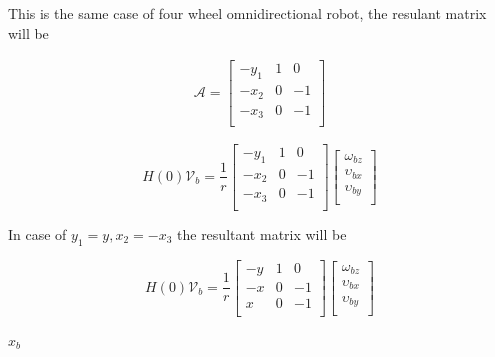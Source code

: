\documentclass{article}
\begin{document}
This is the same case of four wheel omnidirectional robot,
the resulant matrix will be

\begin{align}
    \mathcal{A} =
    \begin{bmatrix}
        -y_1 & 1 & 0  \\
        -x_2 & 0 & -1 \\
        -x_3 & 0 & -1 \\
    \end{bmatrix}
\end{align}

\begin{equation}
    H(0)\mathcal{V}_b = \frac{1}{r}
    \begin{bmatrix}
        -y_1 & 1 & 0  \\
        -x_2 & 0 & -1 \\
        -x_3 & 0 & -1 \\
    \end{bmatrix}
    \begin{bmatrix}
        \omega_{bz}   \\
        \upsilon_{bx} \\
        \upsilon_{by} \\
    \end{bmatrix}
\end{equation}

In case of $ y_1 = y, x_2 = -x_3$ the resultant matrix will be

\begin{equation}
    H(0)\mathcal{V}_b = \frac{1}{r}
    \begin{bmatrix}
        -y & 1 & 0  \\
        -x & 0 & -1 \\
        x & 0 & -1 \\
    \end{bmatrix}
    \begin{bmatrix}
        \omega_{bz}   \\
        \upsilon_{bx} \\
        \upsilon_{by} \\
    \end{bmatrix}
\end{equation}

    $\hat{x}_b$
    
\end{document}
